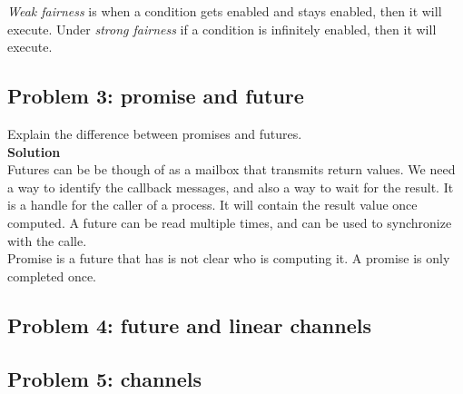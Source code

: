 \textit{Weak fairness} is when a condition gets enabled and stays enabled, then it will execute. 
Under \textit{strong fairness} if a condition is infinitely enabled, then it will execute. 

\subsection{Problem 3: promise and future}

Explain the difference between promises and futures. \\

\textbf{Solution} \\

Futures can be be though of as a mailbox that transmits return values. 
We need a way to identify the callback messages, and also a way to wait for the result.  
It is a handle for the caller of a process. It will contain the result value once computed. 
A future can be read multiple times, and can be used to synchronize with the calle. \\


Promise is a future that has is not clear who is computing it. A promise is only completed once. 



\subsection{Problem 4: future and linear channels}
\subsection{Problem 5: channels}